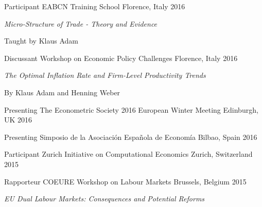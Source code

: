 

\begin{cventries}

\cventry
    {Participant} %
    {EABCN Training School} %
    {Florence, Italy} %
    {2016} %
    {
        \begin{cvitems} %
            \item {\textit{Micro-Structure of Trade - Theory and Evidence}}
            \item {Taught by Klaus Adam}
        \end{cvitems}
    }

\cventry
    {Discussant} %
    {Workshop on Economic Policy Challenges} %
    {Florence, Italy} %
    {2016} %
    {
        \begin{cvitems} %
            \item {\textit{The Optimal Inflation Rate and Firm-Level Productivity Trends}}
            \item {By Klaus Adam and Henning Weber}
        \end{cvitems}
    }

\cventry
    {Presenting} %
    {The Econometric Society 2016 European Winter Meeting} %
    {Edinburgh, UK} %
    {2016} %
    {}

\cventry
    {Presenting} %
    {Simposio de la Asociación Española de Economía} %
    {Bilbao, Spain} %
    {2016} %
    {}

\cventry
    {Participant} %
    {Zurich Initiative on Computational Economics} %
    {Zurich, Switzerland} %
    {2015} %
    {}

\cventry
    {Rapporteur} %
    {COEURE Workshop on Labour Markets} %
    {Brussels, Belgium} %
    {2015} %
    {
      \begin{cvitems} %
        \item {\textit{EU Dual Labour Markets: Consequences and Potential Reforms}}
      \end{cvitems}
    }

\end{cventries}


